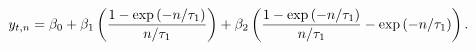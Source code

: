 \begin{equation} \label{eq:nNSzero}
	\yZero = \betaLT + \betaST \left(\loadSTnsZero\right) + \betaMTns \loadMTnsZero. 
\end{equation}